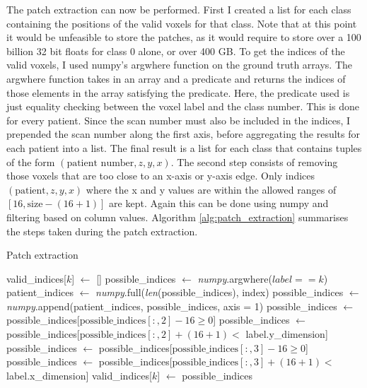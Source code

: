 \documentclass[12pt,a4paper,twoside,openright]{report}
\begin{document}
The patch extraction can now be performed. First I created a list for each class containing the positions of the valid voxels for that class. Note that at this point it would be unfeasible to store the patches, as it would require to store over a 100 billion 32 bit floats for class 0 alone, or over 400 GB. To get the indices of the valid voxels, I used numpy's argwhere function on the ground truth arrays. The argwhere function takes in an array and a predicate and returns the indices of those elements in the array satisfying the predicate. Here, the predicate used is just equality checking between the voxel label and the class number. This is done for every patient. Since the scan number must also be included in the indices, I prepended the scan number along the first axis, before aggregating the results for each patient into a list. The final result is a list for each class that contains tuples of the form $(\text{patient number}, z, y, x)$. The second step consists of removing those voxels that are too close to an x-axis or y-axis edge. Only indices $(\text{patient}, z, y, x)$ where the x and y values are  within the allowed ranges of $[16, \text{size}-(16+1)]$ are kept. Again this can be done using numpy and filtering based on column values. Algorithm \ref{alg:patch_extraction} summarises the steps taken during the patch extraction.

\begin{algorithm}[h]
\caption{Patch extraction}\label{alg:patch_extraction}
\begin{algorithmic}[1]
	\State valid\_indices[$k$] $\gets$ []
		\State possible\_indices $\gets$ \textit{numpy}.argwhere($label == k$)
		\State patient\_indices $\gets$ \textit{numpy}.full(\textit{len}(possible\_indices), index)
		\State possible\_indices $\gets$ \textit{numpy}.append(patient\_indices, possible\_indices, axis = 1)
		\State
		\State possible\_indices $\gets$ possible\_indices[$\text{possible\_indices}[:,2] - 16 \ge 0$]
		\State possible\_indices $\gets$ possible\_indices[$\text{possible\_indices}[:,2] + (16+1) < $ label.y\_dimension]
		\State possible\_indices $\gets$ possible\_indices[$\text{possible\_indices}[:,3] - 16 \ge 0$]
		\State possible\_indices $\gets$ possible\_indices[$\text{possible\_indices}[:,3] + (16+1) < $ label.x\_dimension]
		\State
		\State valid\_indices[$k$] $\gets$ possible\_indices
	\EndFor
\EndFor
\end{algorithmic}
\end{algorithm}
\end{document}
